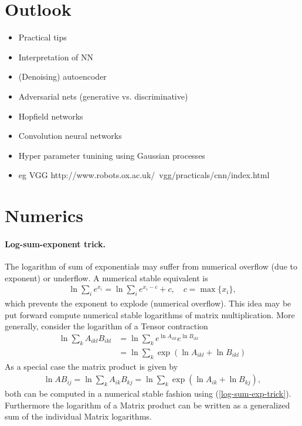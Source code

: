 \documentclass[12pt,a4paper]{article}
\begin{document}
\section{Outlook}
\begin{itemize}\setlength\itemsep{0em}
\item Practical tips \cite{2012arXiv1206.5533B, Hinton2012Practical, DBLP:series/lncs/7700} 
\item Interpretation of NN \cite{2017arXiv170607979M, KinSchAlbMueErhKimDae18}
\item (Denoising) autoencoder 
\item Adversarial nets (generative vs. discriminative)
\item Hopfield networks \cite{ramsauer2020hopfield}
\item Convolution neural networks 
\item Hyper parameter tunining using Gaussian processes
\item eg VGG http://www.robots.ox.ac.uk/~vgg/practicals/cnn/index.html
\end{itemize}

\appendix
\section{Numerics}
\paragraph{Log-sum-exponent trick.} The logarithm of sum of exponentials may suffer from numerical overflow (due to exponent) or underflow. A numerical stable equivalent is
\begin{align} \label{log-sum-exp-trick}
	\ln \sum_i e^{x_i}  =  \ln \sum_i e^{x_i - c} + c, \quad c = \max\{x_i\}, 
\end{align}
which prevents the exponent to explode (numerical overflow). This idea may be put forward compute numerical stable logarithms of matrix multiplication. 
More generally, consider the logarithm of a Tensor contraction  
\begin{align}
\ln \sum_k A_{ikl} B_{ikl} &= \ln \sum_k e^{\ln A_{ikl}} e^{\ln B_{ikl}} \\
& = \ln \sum_k \exp({\ln A_{ikl} + \ln B_{ikl}}) 
\end{align}
As a special case the matrix product is given by
\begin{align}
\ln A B_{ij} = \ln \sum_k A_{ik} B_{kj} = \ln \sum_k \exp({\ln A_{ik} + \ln B_{kj}}),  
\end{align}
both can be computed in a numerical stable fashion using (\ref{log-sum-exp-trick}). Furthermore the logarithm of a Matrix product can be written as a generalized sum of the individual Matrix logarithms.




\end{document}
